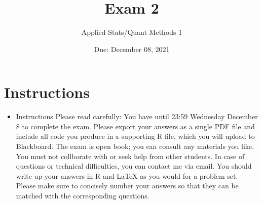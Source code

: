 \documentclass[12pt,letterpaper]{article}
\title{Exam 2}
\date{Due: December 08, 2021}
\author{Applied Stats/Quant Methods 1}
\begin{document}
	\maketitle
	\section*{Instructions}
	\begin{itemize}
		\item Instructions
		Please read carefully: You have until 23:59 Wednesday December 8 to complete
		the exam. Please export your answers as a single PDF file and include all code you
		produce in a supporting R file, which you will upload to Blackboard. The exam is
		open book; you can consult any materials you like. You must not collborate with
		or seek help from other students. In case of questions or technical difficulties, you
		can contact me via email. You should write-up your answers in R and LaTeX as you
		would for a problem set. Please make sure to concisely number your answers so that
		they can be matched with the corresponding questions. 
		
		
	\end{itemize}
	
	
	\newpage
	
		\vspace{.5cm}
\end{document}
